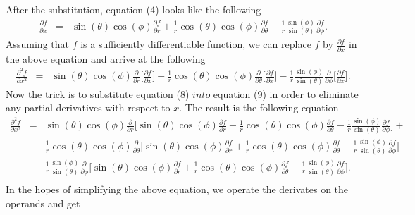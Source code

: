 \documentclass[12pt]{article}
\begin{document}
After the substitution, equation (4) looks like the following
\begin{eqnarray}
\frac{\partial f}{\partial x} &=& \sin(\theta)\cos(\phi)\frac{\partial f}{\partial r} + \frac{1}{r}\cos(\theta)\cos(\phi)\frac{\partial f}{\partial\theta} - \frac{1}{r}\frac{\sin(\phi)}{\sin(\theta)}\frac{\partial f}{\partial\phi}.
\end{eqnarray}
Assuming that $f$ is a sufficiently differentiable function, we can replace $f$ by $\frac{\partial f}{\partial x}$ in the above equation and arrive at the following
\begin{eqnarray}
\frac{{\partial}^2 f}{\partial x^2} &=& \sin(\theta)\cos(\phi)\frac{\partial}{\partial r}\Big[\frac{\partial f}{\partial x}\Big] + \frac{1}{r}\cos(\theta)\cos(\phi)\frac{\partial}{\partial\theta}\Big[\frac{\partial f}{\partial x}\Big] - \frac{1}{r}\frac{\sin(\phi)}{\sin(\theta)}\frac{\partial}{\partial\phi}\Big[\frac{\partial f}{\partial x}\Big].
\end{eqnarray}
Now the trick is to substitute equation (8) $\textit{into}$ equation (9) in order to eliminate any partial derivatives with respect to $x$. The result is the following equation
\begin{eqnarray*}
\frac{{\partial}^2 f}{\partial x^2} &=& \sin(\theta)\cos(\phi)\frac{\partial}{\partial r}\Big[\sin(\theta)\cos(\phi)\frac{\partial f}{\partial r} + \frac{1}{r}\cos(\theta)\cos(\phi)\frac{\partial f}{\partial\theta} - \frac{1}{r}\frac{\sin(\phi)}{\sin(\theta)}\frac{\partial f}{\partial\phi}\Big] + \\
& & \frac{1}{r}\cos(\theta)\cos(\phi)\frac{\partial}{\partial\theta}\Big[\sin(\theta)\cos(\phi)\frac{\partial f}{\partial r} + \frac{1}{r}\cos(\theta)\cos(\phi)\frac{\partial f}{\partial\theta} - \frac{1}{r}\frac{\sin(\phi)}{\sin(\theta)}\frac{\partial f}{\partial\phi}\Big] - \\
& & \frac{1}{r}\frac{\sin(\phi)}{\sin(\theta)}\frac{\partial}{\partial\phi}\Big[\sin(\theta)\cos(\phi)\frac{\partial f}{\partial r} + \frac{1}{r}\cos(\theta)\cos(\phi)\frac{\partial f}{\partial\theta} - \frac{1}{r}\frac{\sin(\phi)}{\sin(\theta)}\frac{\partial f}{\partial\phi}\Big].\\
\end{eqnarray*}
In the hopes of simplifying the above equation, we operate the derivates on the operands and get
\end{document}
